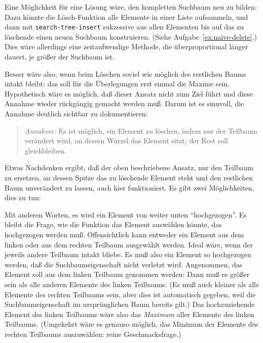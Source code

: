 Eine Möglichkeit für eine Lösung wäre, den kompletten Suchbaum neu zu
bilden: Dazu könnte die Lösch-Funktion alle Elemente in einer Liste
aufsammeln, und dann mit \texttt{search-tree-insert} sukzessive aus
allen Elementen bis auf das zu löschende einen neuen Suchbaum
konstruieren.  (Siehe Aufgabe~\ref{ex:naive-delete}.)  Dies wäre
allerdings eine zeitaufwendige Methode, die überproportional länger
dauert, je größer der Suchbaum ist.

Besser wäre also, wenn beim Löschen soviel wie möglich des restlichen
Baums intakt bleibt: das soll für die Überlegungen erst einmal die
Maxime sein.  Hypothetisch wäre es möglich, daß dieser Ansatz nicht
zum Ziel führt und diese Annahme wieder rückgängig gemacht werden
muß.  Darum ist es sinnvoll, die Annahme deutlich sichtbar
zu dokumentieren:

\begin{quote}
  \textit{Annahme:} Es ist möglich, ein Element zu löschen, indem nur
  der Teilbaum verändert wird, an dessen Wurzel das Element sitzt; der
  Rest soll gleichbleiben.
\end{quote}

Etwas Nachdenken ergibt, daß der oben beschriebene
Ansatz, nur den Teilbaum zu ersetzen, an dessen Spitze das zu
löschende Element steht und den restlichen Baum unverändert zu lassen,
auch hier funktioniert.  Es gibt zwei Möglichkeiten, dies zu tun:
%
\begin{pspdf}
\begin{center}
  {
    \Tdot
  }
  \qquad
  {
    \Tdot
  }
\end{center}
\end{pspdf}
% 
Mit anderen Worten, es wird ein Element von weiter unten
"`hochgezogen"'.  Es bleibt die Frage, wie die Funktion das Element
auswählen könnte, das hochgezogen werden muß.  Offensichtlich kann
entweder ein Element aus dem linken oder aus dem rechten Teilbaum
ausgewählt werden.  Ideal wäre, wenn der jeweils andere Teilbaum
intakt bliebe.  Es muß also ein Element so hochgezogen werden, daß die
Suchbaumeigenschaft nicht verletzt wird.  Angenommen, das Element soll
aus dem linken Teilbaum genommen werden: Dann muß es größer sein als
alle anderen Elemente des linken Teilbaums.  (Es muß auch kleiner als
alle Elemente des rechten Teilbaums sein, aber dies ist automatisch
gegeben, weil die Suchbaumeigenschaft im ursprünglichen Baum bereits
gilt.)  Das hochzuziehende Element des linken Teilbaums wäre  also das
\emph{Maximum} aller Elemente des linken Teilbaums.  (Umgekehrt wäre
es genauso möglich, das Minimum der Elemente des rechten Teilbaums
auszuwählen: reine Geschmacksfrage.)

